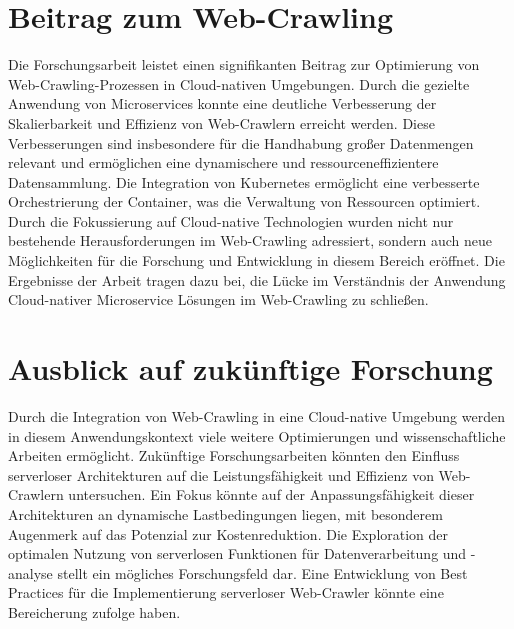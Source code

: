\section{Beitrag zum Web-Crawling}
Die Forschungsarbeit leistet einen signifikanten Beitrag zur Optimierung von Web-Crawling-Prozessen in Cloud-nativen Umgebungen. Durch die gezielte Anwendung von Microservices konnte eine deutliche Verbesserung der Skalierbarkeit und Effizienz von Web-Crawlern erreicht werden. Diese Verbesserungen sind insbesondere für die Handhabung großer Datenmengen relevant und ermöglichen eine dynamischere und ressourceneffizientere Datensammlung. Die Integration von Kubernetes ermöglicht eine verbesserte Orchestrierung der Container, was die Verwaltung von Ressourcen optimiert. Durch die Fokussierung auf Cloud-native Technologien wurden nicht nur bestehende Herausforderungen im Web-Crawling adressiert, sondern auch neue Möglichkeiten für die Forschung und Entwicklung in diesem Bereich eröffnet. Die Ergebnisse der Arbeit tragen dazu bei, die Lücke im Verständnis der Anwendung Cloud-nativer Microservice Lösungen im Web-Crawling zu schließen.

\section{Ausblick auf zukünftige Forschung}
Durch die Integration von Web-Crawling in eine Cloud-native Umgebung werden in diesem Anwendungskontext viele weitere Optimierungen und wissenschaftliche Arbeiten ermöglicht. Zukünftige Forschungsarbeiten könnten den Einfluss serverloser Architekturen auf die Leistungsfähigkeit und Effizienz von Web-Crawlern untersuchen. Ein Fokus könnte auf der Anpassungsfähigkeit dieser Architekturen an dynamische Lastbedingungen liegen, mit besonderem Augenmerk auf das Potenzial zur Kostenreduktion. Die Exploration der optimalen Nutzung von serverlosen Funktionen für Datenverarbeitung und -analyse stellt ein mögliches Forschungsfeld dar. Eine Entwicklung von Best Practices für die Implementierung serverloser Web-Crawler könnte eine Bereicherung zufolge haben.


\chapterend

